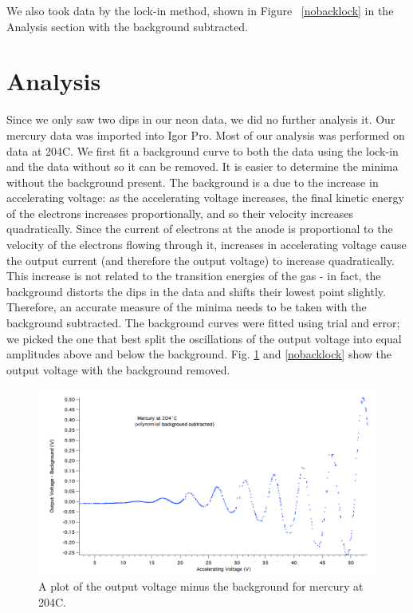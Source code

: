 \documentclass[prb,preprint]{revtex4-1}
\begin{document}
We also took data by the lock-in method, shown in Figure ~\ref{nobacklock} in the Analysis section with the background subtracted. 

\section{Analysis}
Since we only saw two dips in our neon data, we did no further analysis it. Our mercury data was imported into Igor Pro. Most of our analysis was performed on data at 204\degree C. 
We first fit a background curve to both the data using the lock-in and the data without so it can be removed.
It is easier to determine the minima without the background present.
The background is a due to the increase in accelerating voltage: as the accelerating voltage increases, the final kinetic energy of the electrons increases proportionally, and so their velocity increases quadratically. Since the current of electrons at the anode is proportional to the velocity of the electrons flowing through it, increases in accelerating voltage cause the output current (and therefore the output voltage) to increase quadratically.  This increase is not related to the transition energies of the gas - in fact, the background distorts the dips in the data and shifts their lowest point slightly.  Therefore, an accurate measure of the minima needs to be taken with the background subtracted. 
The background curves were fitted using trial and error; we picked the one that best split the oscillations of the output voltage into equal amplitudes above and below the background. 
Fig. \ref{nobacknolock} and \ref{nobacklock} show the output voltage with the background removed. 

\begin{figure}[h!] %
\centering
\includegraphics[width=6in]{204C_noback.png}
\caption{A plot of the output voltage minus the background for mercury at 204\degree C.}
\label{nobacknolock}
\end{figure}
\end{document}
